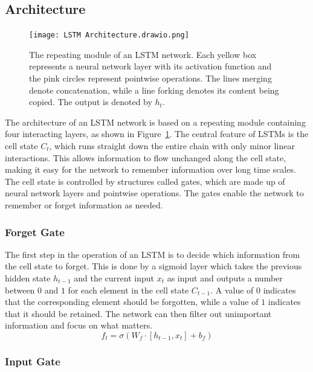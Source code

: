 \documentclass{article}
\newcommand{\reffig}[1]{Figure~\ref{#1}}
\begin{document}
\subsection{Architecture}
\label{sec:3.0}

\begin{figure}
  \centering
  \texttt{[image: LSTM Architecture.drawio.png]}
  \caption{The repeating module of an LSTM network. Each yellow box represents a neural
    network layer with its activation function and the pink circles represent pointwise
    operations. The lines merging denote concatenation, while a line forking denotes its
    content being copied. The output is denoted by $h_t$. \cite{olahUnderstandingLSTM}}
  \label{fig:lstm}
\end{figure}

The architecture of an LSTM network is based on a repeating module containing four
interacting layers, as shown in \reffig{fig:lstm}. The central feature of LSTMs is the
cell state $C_t$, which runs straight down the entire chain with only minor linear
interactions. This allows information to flow unchanged along the cell state, making it
easy for the network to remember information over long time scales. The cell state is
controlled by structures called gates, which are made up of neural network layers and
pointwise operations. The gates enable the network to remember or forget information as
needed.


\subsubsection{Forget Gate}
\label{sec:3.0.0}

The first step in the operation of an LSTM is to decide which information from the cell
state to forget. This is done by a sigmoid layer which takes the previous hidden state
$h_{t-1}$ and the current input $x_t$ as input and outputs a number between $0$ and $1$
for each element in the cell state $C_{t-1}$. A value of $0$ indicates that the
corresponding element should be forgotten, while a value of $1$ indicates that it should
be retained. The network can then filter out unimportant information and focus on what
matters.
\begin{equation}
  f_t = \sigma(W_f \cdot [h_{t-1}, x_t] + b_f)
\end{equation}


\subsubsection{Input Gate}
\label{sec:3.0.1}
\end{document}
